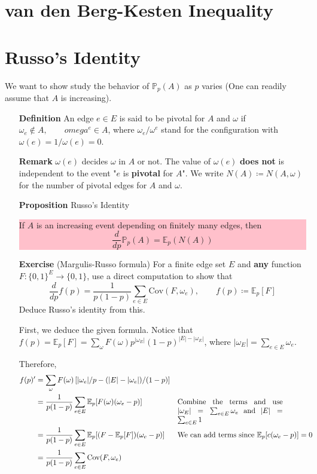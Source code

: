 \documentclass[12pt,a4paper]{report}
\theoremstyle{definition}
\newcommand{\SOL}{\fbox{ \tt s\parbox[b][2pt][c]{6pt}{o}\hspace*{-7pt} L:}}
\begin{document}
\section{van den Berg-Kesten Inequality}
\section{Russo's Identity}
We want to show study the behavior of  $\mathbb{P}_p(A)$ as $p$ varies (One can readily assume that $A$ is increasing).
\begin{enumerate}
	\item[\textbf{Definition}] An edge $e \in E$ is said to be pivotal for $A$ and $\omega$ if $\omega_e \notin A, \qquad omega^e \in A$, where $\omega_e / \omega^e$ stand for the configuration with $\omega(e) = 1/\omega(e) = 0$.
	\item[\textbf{Remark}] $\omega(e)$ decides $\omega$ in $A$ or not. The value of $\omega(e)$ \textbf{does not} is independent to the event "$e$ is \textbf{pivotal} for $A$". We write $N(A) \coloneqq N(A,\omega)$ for the number of pivotal edges for $A$ and $\omega$.
	\item[\textbf{Proposition}] Russo's Identity\\
	\colorbox{pink}{
		\begin{minipage}{1 \textwidth}
			If $A$ is an increasing event depending on finitely many edges, then 
			$$
	 			\frac{d}{d p} \mathbb{P}_p(A)  = \mathbb{E}_p(N(A))
			$$
		\end{minipage}
	}  
	\bigskip
	\item[\textbf{Exercise}](Margulis-Russo formula) For a finite edge set $E$ and \textbf{any} function $F : \{0,1\}^E \to \{0,1\}$, use a direct computation to show that 
	 $$
	 \frac{d}{d p} f(p)  = \frac{1}{p(1-p)} \sum_{e \in E} \text{Cov}(F,\omega_e),\qquad f(p) \coloneqq \mathbb{E}_p [F]
	 $$ 
	 Deduce Russo's identity from this.
	\item[\SOL]
		First, we deduce the given formula. 
		Notice that $f(p) = \mathbb{E}_p[F]=\sum_{\omega} F(\omega) p^{|\omega_E|}(1-p)^{|E| - |\omega_E|}$, where $|\omega_E| = \sum_{e\in E} \omega_e$.

		Therefore,
		\begin{equation*}
			\begin{aligned}
				f(p)' &= \sum_{\omega}F(\omega)\left[|\omega_e|/p - (|E|-|\omega_e|)/(1-p) \right] 
				   \\ &= \frac{1}{p(1-p)}\sum_{e\in E}\mathbb{E}_p[F(\omega)(\omega_e - p)] && \parbox[t]{5cm}{Combine the terms and use $|\omega_E| = \sum_{e\in E} \omega_e$ and  $|E| = \sum_{e \in E} 1$ }
				   \\ &= \frac{1}{p(1-p)}\sum_{e \in E}\mathbb{E}_p[(F-\mathbb{E}_p[F])(\omega_e - p)] && \text{We can add terms since $\mathbb{E}_p[c(\omega_e - p)] = 0$}
				   \\ &= \frac{1}{p(1-p)}\sum_{e\in E}\text{Cov}(F,\omega_e)
			\end{aligned}
		\end{equation*} 
		

\end{enumerate}
\end{document}
